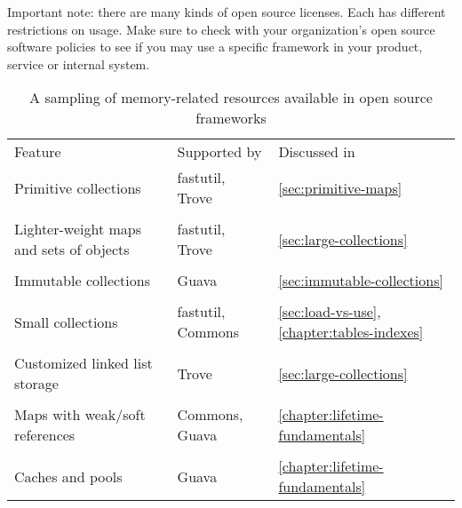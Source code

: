 Important note: there are many kinds of open source licenses. Each has different
restrictions on usage. Make sure to check with your organization's open
source software policies to see if you may use a specific framework in 
your product, service or internal system.

\begin{table}
\centering
	\begin{tabular}{p{6cm} p{3cm} p{4cm}}
	\toprule

	   Feature & Supported by & Discussed in
	\\ \cmidrule(r){1-1} \cmidrule(l){2-2} \cmidrule(l){3-3}
	Primitive collections & fastutil, Trove & \autoref{sec:primitive-maps}
	\\
	\\
	Lighter-weight maps and sets of objects & fastutil, Trove &
	\autoref{sec:large-collections}
	\\
	\\
	Immutable collections & Guava & \autoref{sec:immutable-collections}
	\\
	\\
	Small collections & fastutil, Commons & \autoref{sec:load-vs-use}, 
	\autoref{chapter:tables-indexes}
	\\
	\\
	Customized linked list storage & Trove & \autoref{sec:large-collections}
	\\
	\\
	Maps with weak/soft references & Commons, Guava &
	\autoref{chapter:lifetime-fundamentals}
	\\
	\\
	Caches and pools & Guava & \autoref{chapter:lifetime-fundamentals}
	\\
	\bottomrule
	\end{tabular}
	\caption{A sampling of memory-related resources available in open source
	frameworks}
	\label{tab:alternative-collections}
\end{table}


